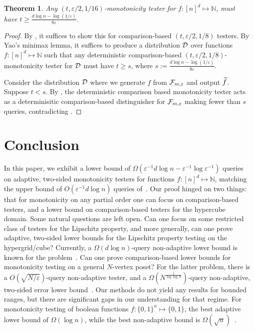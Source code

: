 \documentclass[11pt]{article}
\newtheorem{theorem}{Theorem}[section]
\def\eps{\varepsilon}
\newcommand{\cD}{{\cal D}}
\newcommand{\cF}{{\cal F}}
\newcommand{\NN}{\mathbb{N}}
\begin{document}
\begin{theorem}\label{thm:hc}
Any $(t,\eps/2,1/16)$-monotonicity tester for $f:[n]^d\mapsto \NN$, must have $t\geq \frac{d\log n - \log(1/\eps)}{8\eps}$.
\end{theorem}

\begin{proof} By , it suffices to show this for comparison-based $(t,\eps/2,1/8)$ testers.
By Yao's minimax lemma, it suffices to produce a distribution $\cD$ over functions $f:[n]^d\mapsto \NN$ such
that any deterministic comparison-based $(t,\eps/2,1/8)$-monotonicity tester for $\cD$ must have $t\geq s$,
where $s := \frac{d\log n - \log(1/\eps)}{8\eps}$.

Consider the distribution $\cD$ where we generate $f$ from $\cF_{m,\eps}$ and output $\widetilde{f}$. 
Suppose $t < s$. By , the deterministic comparison based monotonicity tester acts as a determinisitic comparison-based distinguisher
for $\cF_{m,\eps}$
making fewer than $s$ queries, contradicting .
\end{proof}

\section{Conclusion}
In this paper, we exhibit a lower bound of $\Omega(\eps^{-1}d\log n - \eps^{-1}\log \eps^{-1})$ queries on adaptive, two-sided monotonicity testers for functions $f:[n]^d \mapsto \NN$, matching the upper bound of $O(\eps^{-1}d\log n)$ queries of~\cite{ChSe13}. Our proof hinged on two things: that for monotonicity on any partial order one can focus on comparison-based testers, and a lower bound on comparison-based testers for the hypercube domain.  Some natural questions are left open. Can one focus on some restricted class of testers for the Lipschitz property, and more generally, can one prove adaptive, two-sided lower bounds for the Lipschitz property testing on the hypergrid/cube? 
Currently, a $\Omega(d\log n)$-query non-adaptive lower bound is known for the problem~\cite{BlJh+12}.
Can one prove comparison-based lower bounds for monotonicity testing on a general $N$-vertex poset? For the latter problem, there is a $O(\sqrt{N/\eps})$-query non-adaptive tester, and a $\Omega(N^{\frac{1}{\log\log N}})$-query non-adaptive, two-sided error lower bound~\cite{FLNRRS02}.
Our methods do not yield any results for bounded ranges, but there are significant gaps in our understanding for that regime. 
For monotonicity testing of boolean functions $f:\{0,1\}^n \mapsto \{0,1\}$, the best adaptive lower bound
of $\Omega(\log n)$, while the best non-adaptive bound is $\Omega(\sqrt{n})$~\cite{FLNRRS02}. 



\end{document}
